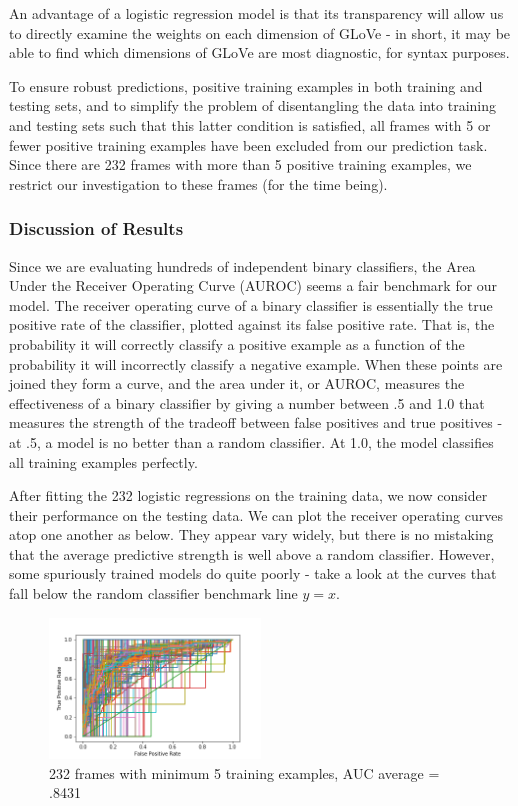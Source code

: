 \documentclass[a4paper]{article}
\begin{document}
An advantage of a logistic regression model is that its transparency will allow us to directly examine the weights on each dimension of GLoVe - in short, it may be able to find which dimensions of GLoVe are most diagnostic, for syntax purposes.

To ensure robust predictions, positive training examples in both training and testing sets, and to simplify the problem of disentangling the data into training and testing sets such that this latter condition is satisfied, all frames with 5 or fewer positive training examples have been excluded from our prediction task. Since there are 232 frames with more than 5 positive training examples, we restrict our investigation to these frames (for the time being).

\subsubsection{Discussion of Results}

Since we are evaluating hundreds of independent binary classifiers, the Area Under the Receiver Operating Curve (AUROC) seems a fair benchmark for our model. The receiver operating curve of a binary classifier is essentially the true positive rate of the classifier, plotted against its false positive rate. That is, the probability it will correctly classify a positive example as a function of the probability it will incorrectly classify a negative example. When these points are joined they form a curve, and the area under it, or AUROC, measures the effectiveness of a binary classifier by giving a number between .5 and 1.0 that measures the strength of the tradeoff between false positives and true positives - at .5, a model is no better than a random classifier. At 1.0, the model classifies all training examples perfectly. 

After fitting the 232 logistic regressions on the training data, we now consider their performance on the testing data. We can plot the receiver operating curves atop one another as below. They appear vary widely, but there is no mistaking that the average predictive strength is well above a random classifier. However, some spuriously trained models do quite poorly - take a look at the curves that fall below the random classifier benchmark line $y = x$.  

\begin{figure}[H]
\centering
\includegraphics[width=0.5\textwidth]{AUC_plot5.png}
\caption{\label{fig:frog} 232 frames with minimum 5 training examples, AUC average = .8431}
\end{figure}
\end{document}
